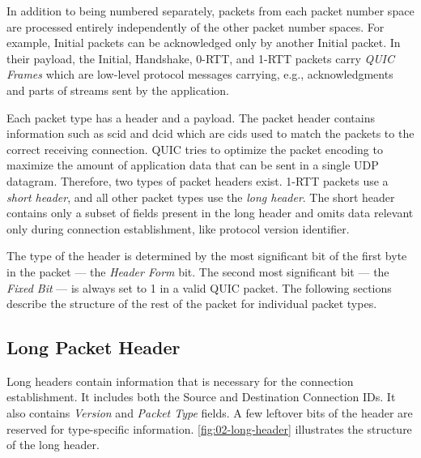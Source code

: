 In addition to being numbered separately, packets from each packet number space are processed
entirely independently of the other packet number spaces. For example, Initial packets can be
acknowledged only by another Initial packet. In their payload, the Initial, Handshake, 0-RTT, and
1-RTT packets carry \textit{QUIC Frames} which are low-level protocol messages carrying, e.g.,
acknowledgments and parts of streams sent by the application.

Each packet type has a header and a payload. The packet header contains information such as
\gls{scid} and \gls{dcid} which are \glspl{cid} used to match the packets to the correct receiving
connection. QUIC tries to optimize the packet encoding to maximize the amount of application data
that can be sent in a single UDP datagram. Therefore, two types of packet headers exist. 1-RTT
packets use a \textit{short header}, and all other packet types use the \textit{long header}. The
short header contains only a subset of fields present in the long header and omits data relevant
only during connection establishment, like protocol version identifier.

The type of the header is determined by the most significant bit of the first byte in the packet ---
the \textit{Header Form} bit. The second most significant bit --- the \textit{Fixed Bit} --- is
always set to 1 in a valid QUIC packet. The following sections describe the structure of the rest of
the packet for individual packet types.

\newcommand{\longFieldHeight}{1}

\subsection{Long Packet Header}

Long headers contain information that is necessary for the connection establishment. It includes
both the Source and Destination Connection IDs. It also contains \textit{Version} and \textit{Packet
Type} fields. A few leftover bits of the header are reserved for type-specific information.
\autoref{fig:02-long-header} illustrates the structure of the long header.

